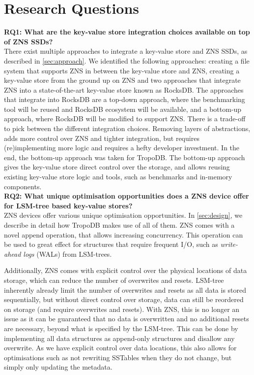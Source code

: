 \section{Research Questions}
\textbf{RQ1: What are the key-value store integration choices available on top of ZNS SSDs?}\\
There exist multiple approaches to integrate a key-value store and ZNS SSDs, as described in \autoref{sec:approach}. We identified the following approaches: creating a file system that supports ZNS in between the key-value store and ZNS, creating a key-value store from the ground up on ZNS and two approaches that integrate ZNS into a state-of-the-art key-value store known as RocksDB. The approaches that integrate into RocksDB are a top-down approach, where the benchmarking tool will be reused and RocksDB ecosystem will be available, and a bottom-up approach, where RocksDB will be modified to support ZNS. There is a trade-off to pick between the different integration choices. Removing layers of abstractions, adds more control over ZNS and tighter integration, but requires (re)implementing more logic and requires a hefty developer investment. In the end, the bottom-up approach was taken for TropoDB. The bottom-up approach gives the key-value store direct control over the storage, and allows reusing existing key-value store logic and tools, such as benchmarks and in-memory components. \\
\textbf{RQ2: What unique optimisation opportunities does a ZNS device offer for LSM-tree based key-value stores?}\\
ZNS devices offer various unique optimisation opportunities.  In \autoref{sec:design}, we describe in detail how TropoDB makes use of all of them. ZNS comes with a novel append operation, that allows increasing concurrency. This operation can be used to great effect for structures that require frequent I/O, such as \textit{write-ahead logs} (WALs) from LSM-trees. 

Additionally, ZNS comes with explicit control over the physical locations of data storage, which can reduce the number of overwrites and resets. LSM-tree inherently already limit the number of overwrites and resets as all data is stored sequentially, but without direct control over storage, data can still be reordered on storage (and require overwrites and resets). With ZNS, this is no longer an issue as it can be guaranteed that no data is overwritten and no additional resets are necessary, beyond what is specified by the LSM-tree. This can be done by implementing all data structures as append-only structures and disallow any overwrite. As we have explicit control over data locations, this also allows for optimisations such as not rewriting SSTables when they do not change, but simply only updating the metadata.

